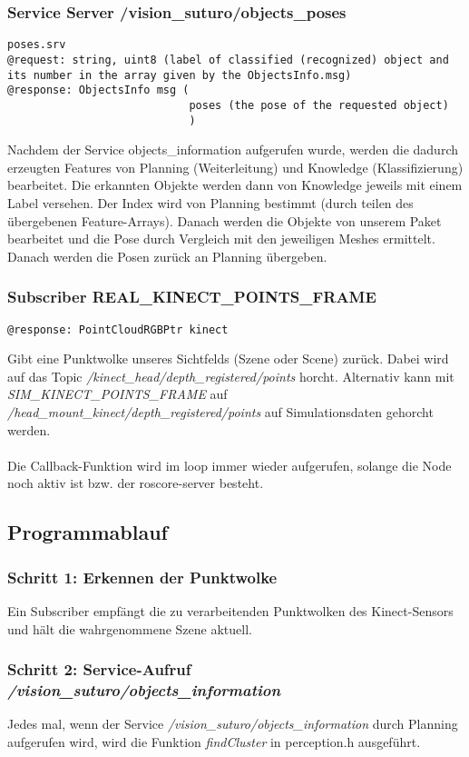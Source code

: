 \documentclass{suturo}
\begin{document}
\subsubsection{Service Server /vision\_suturo/objects\_poses}
\begin{verbatim}
poses.srv
@request: string, uint8 (label of classified (recognized) object and its number in the array given by the ObjectsInfo.msg)
@response: ObjectsInfo msg (
							poses (the pose of the requested object)
							)
\end{verbatim}
Nachdem der Service objects\_information aufgerufen wurde, werden die dadurch erzeugten Features von Planning (Weiterleitung) und Knowledge (Klassifizierung) bearbeitet. Die erkannten Objekte werden dann von Knowledge jeweils mit einem Label versehen. Der Index wird von Planning bestimmt (durch teilen des übergebenen Feature-Arrays). Danach werden die Objekte von unserem Paket bearbeitet und die Pose durch Vergleich mit den jeweiligen Meshes ermittelt. Danach werden die Posen zurück an Planning übergeben.

\subsubsection{Subscriber REAL\_KINECT\_POINTS\_FRAME}
\begin{verbatim}
@response: PointCloudRGBPtr kinect
\end{verbatim}
Gibt eine Punktwolke unseres Sichtfelds (Szene oder Scene) zurück. Dabei wird auf das Topic \textit{/kinect\_head/depth\_registered/points} horcht. Alternativ kann mit \textit{SIM\_KINECT\_POINTS\_FRAME} auf \textit{/head\_mount\_kinect/depth\_registered/points} auf Simulationsdaten gehorcht werden.
\\ \\
Die Callback-Funktion wird im loop immer wieder aufgerufen, solange die Node noch aktiv ist bzw. der roscore-server besteht.

\subsection{Programmablauf}
\subsubsection{Schritt 1: Erkennen der Punktwolke}
Ein Subscriber empfängt die zu verarbeitenden Punktwolken des Kinect-Sensors und hält die wahrgenommene Szene aktuell.
\subsubsection{Schritt 2: Service-Aufruf \textit{/vision\_suturo/objects\_information}}
Jedes mal, wenn der Service \textit{/vision\_suturo/objects\_information} durch Planning aufgerufen wird, wird die Funktion \textit{findCluster} in perception.h ausgeführt. 
\end{document}
